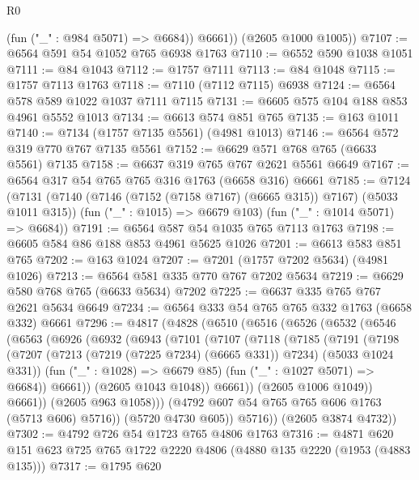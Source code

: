 \begin{lexlean}{R0}
\begin{coremodule}
{{{{{            (fun ("_" : @984 @5071) => @6684))
          @6661))
      (@2605 @1000 @1005))
@7107 := @6564 @591 @54 @1052 @765 @6938 @1763
@7110 := @6552 @590 @1038 @1051
@7111 := @84 @1043
@7112 := @1757 @7111
@7113 := @84 @1048
@7115 := @1757 @7113 @1763
@7118 := @7110 (@7112 @7115) @6938
@7124 := @6564 @578 @589 @1022 @1037 @7111 @7115
@7131 := @6605 @575 @104 @188 @853 @4961 @5552 @1013
@7134 := @6613 @574 @851 @765
@7135 := @163 @1011
@7140 := @7134 (@1757 @7135 @5561) (@4981 @1013)
@7146 := @6564 @572 @319 @770 @767 @7135 @5561
@7152 := @6629 @571 @768 @765 (@6633 @5561) @7135
@7158 := @6637 @319 @765 @767 @2621 @5561 @6649
@7167 := @6564 @317 @54 @765 @765 @316 @1763 (@6658 @316) @6661
@7185 := @7124
    (@7131
      (@7140 (@7146 (@7152 (@7158 @7167) (@6665 @315)) @7167) (@5033 @1011 @315))
      (fun ("_" : @1015) => @6679 @103)
      (fun ("_" : @1014 @5071) => @6684))
@7191 := @6564 @587 @54 @1035 @765 @7113 @1763
@7198 := @6605 @584 @86 @188 @853 @4961 @5625 @1026
@7201 := @6613 @583 @851 @765
@7202 := @163 @1024
@7207 := @7201 (@1757 @7202 @5634) (@4981 @1026)
@7213 := @6564 @581 @335 @770 @767 @7202 @5634
@7219 := @6629 @580 @768 @765 (@6633 @5634) @7202
@7225 := @6637 @335 @765 @767 @2621 @5634 @6649
@7234 := @6564 @333 @54 @765 @765 @332 @1763 (@6658 @332) @6661
@7296 := @4817
    (@4828
      (@6510
        (@6516
          (@6526
            (@6532
              (@6546
                (@6563
                  (@6926
                    (@6932
                      (@6943
                        (@7101
                          (@7107
                            (@7118
                              (@7185
                                (@7191
                                  (@7198
                                    (@7207
                                      (@7213 (@7219 (@7225 @7234) (@6665 @331)) @7234)
                                      (@5033 @1024 @331))
                                    (fun ("_" : @1028) => @6679 @85)
                                    (fun ("_" : @1027 @5071) => @6684))
                                  @6661))
                              (@2605 @1043 @1048))
                            @6661))
                        (@2605 @1006 @1049))
                      @6661))
                  (@2605 @963 @1058)))
              (@4792 @607 @54 @765 @765 @606 @1763 (@5713 @606) @5716))
            (@5720 @4730 @605))
          @5716))
      (@2605 @3874 @4732))
@7302 := @4792 @726 @54 @1723 @765 @4806 @1763
@7316 := @4871 @620 @151 @623 @725 @765 @1722 @2220 @4806 (@4880 @135 @2220 (@1953 (@4883 @135)))
@7317 := @1795 @620
}}}}}
\end{coremodule}
\end{lexlean}
